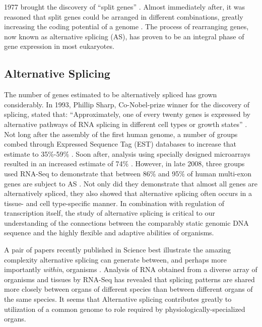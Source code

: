   1977 brought the discovery of ``split genes'' \citep{Berget1977,Chow1977}. Almost immediately after, it was reasoned that split genes could be arranged in different combinations, greatly increasing the coding potential of a genome \citep{Gilbert1978a}. The process of rearranging genes, now known as alternative splicing (AS), has proven to be an integral phase of gene expression in most eukaryotes. 

  \subsection{Alternative Splicing}\label{Intro:subsec:Alternative Splicing}

    The number of genes estimated to be alternatively spliced has grown considerably. In 1993, Phillip Sharp, Co-Nobel-prize winner for the discovery of splicing, stated that: ``Approximately, one of every twenty genes is expressed by alternative pathways of RNA splicing in different cell types or growth states'' \cite{Sharp2014}. Not long after the assembly of the first human genome, a number of groups combed through Expressed Sequence Tag (EST) databases to increase that estimate to 35\%-59\% \citep{Modrek2002}. Soon after, analysis using specially designed microarrays resulted in an increased estimate of 74\% \citep{Johnson2003}. However, in late 2008, three groups used RNA-Seq to demonstrate that between 86\% and 95\% of human multi-exon genes are subject to AS \citep{Pan2008, Wang2008, Sultan2008}. Not only did they demonstrate that almost all genes are alternatively spliced, they also showed that alternative splicing often occurs in a tissue- and cell type-specific manner. In combination with regulation of transcription itself, the study of alternative splicing is critical to our understanding of the connections between the comparably static genomic DNA sequence and the highly flexible and adaptive abilities of organisms.

    A pair of papers recently published in Science best illustrate the amazing complexity alternative splicing can generate between, and perhaps more importantly \textit{within}, organisms \citep{Barbosa-Morais2012,Merkin2012}. Analysis of RNA obtained from a diverse array of organisms and tissues by RNA-Seq has revealed that splicing patterns are shared more closely between organs of different species than between different organs of the same species. It seems that Alternative splicing contributes greatly to utilization of a common genome to role required by physiologically-specialized organs. 

